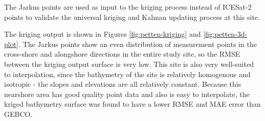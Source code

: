 The Jarkus points are used as input to the kriging process instead of ICESat-2 points to validate the universal kriging and Kalman updating process at this site. 

\begin{figure}[!ht]
    \begin{floatrow}
    \end{floatrow}    
\end{figure}

The kriging output is shown in Figures \ref{fig:petten-kriging} and \ref{fig:petten-3d-plot}. The Jarkus points show an even distribution of measurement points in the cross-shore and alongshore directions in the entire study site, so the RMSE between the kriging output surface is very low. This site is also very well-suited to interpolation, since the bathymetry of the site is relatively homogenous and isotropic - the slopes and elevations are all relatively constant. Because this nearshore area has good quality point data and also is easy to interpolate, the kriged bathymetry surface was found to have a lower RMSE and MAE error than GEBCO. 

